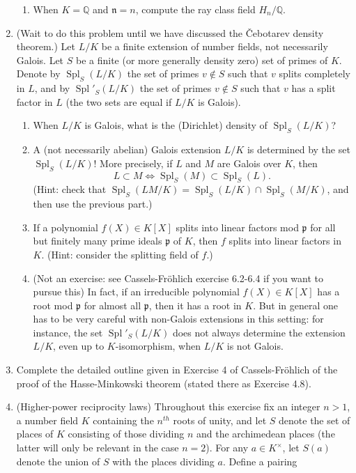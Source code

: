 \documentclass[11pt,answers,addpoints,reqno]{exam}
\theoremstyle{definition}
\theoremstyle{remark}
\theoremstyle{definition}
\theoremstyle{remark}
\theoremstyle{remark}
\theoremstyle{remark}
\newcommand{\Q}{\mathbb{Q}}
\DeclareMathOperator{\Spl}{Spl}
\newcommand{\mf}{\mathfrak}
\begin{document}
\begin{enumerate}
\begin{enumerate}
\item When $K= \Q$ and $\mf{n}=n$, compute the ray class field $H_n/\Q$.
\end{enumerate}
\item (Wait to do this problem until we have discussed the \v{C}ebotarev density theorem.) Let $L/K$ be a finite extension of number fields, not necessarily Galois. Let $S$ be a finite (or more generally density zero) set of primes of $K$. Denote by $\Spl_S(L/K)$ the set of primes $v \not \in S$ such that $v$ splits completely in $L$, and by $\Spl'_S(L/K)$ the set of primes $v \not \in S$ such that $v$ has a split factor in $L$ (the two sets are equal if $L/K$ is Galois).
\begin{enumerate}
\item When $L/K$ is Galois, what is the (Dirichlet) density of $\Spl_S(L/K)$?
\item A (not necessarily abelian) Galois extension $L/K$ is determined by the set $\Spl_S(L/K)$! More precisely, if $L$ and $M$ are Galois over $K$, then 
\[
 L \subset M \iff \Spl_S(M) \subset \Spl_S(L).
\]
(Hint: check that $\Spl_S(LM/K)= \Spl_S(L/K) \cap \Spl_S(M/K)$, and then use the previous part.)
\item If a polynomial $f(X) \in K[X]$ splits into linear factors mod $\mathfrak{p}$ for all but finitely many prime ideals $\mathfrak{p}$ of $K$, then $f$ splits into linear factors in $K$. (Hint: consider the splitting field of $f$.)
\item (Not an exercise: see Cassels-Fr\"{o}hlich exercise 6.2-6.4 if you want to pursue this) In fact, if an irreducible polynomial $f(X) \in K[X]$ has a root mod $\mathfrak{p}$ for almost all $\mathfrak{p}$, then it has a root in $K$. But in general one has to be very careful with non-Galois extensions in this setting: for instance, the set $\Spl'_S(L/K)$ does not always determine the extension $L/K$, even up to $K$-isomorphism, when $L/K$ is not Galois.
\end{enumerate}
\item Complete the detailed outline given in Exercise 4 of Cassels-Fr\"{o}hlich of the proof of the Hasse-Minkowski theorem (stated there as Exercise 4.8).
\item (Higher-power reciprocity laws) Throughout this exercise fix an integer $n>1$, a number field $K$ containing the $n^{th}$ roots of unity, and let $S$ denote the set of places of $K$ consisting of those dividing $n$ and the archimedean places (the latter will only be relevant in the case $n=2$). For any $a \in K^\times$, let $S(a)$ denote the union of $S$ with the places dividing $a$. Define a pairing

\end{enumerate}
\end{document}
